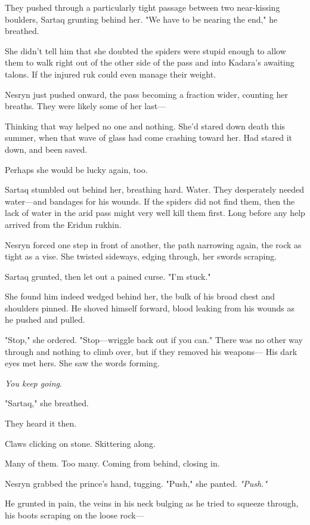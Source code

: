 They pushed through a particularly tight passage between two near-kissing boulders, Sartaq grunting behind her.
"We have to be nearing the end," he breathed.

She didn't tell him that she doubted the spiders were stupid enough to allow them to walk right out of the other side of the pass and into Kadara's awaiting talons.
If the injured ruk could even manage their weight.

Nesryn just pushed onward, the pass becoming a fraction wider, counting her breaths.
They were likely some of her last---

Thinking that way helped no one and nothing.
She'd stared down death this summer, when that wave of glass had come crashing toward her.
Had stared it down, and been saved.

Perhaps she would be lucky again, too.

Sartaq stumbled out behind her, breathing hard.
Water.
They desperately needed water---and bandages for his wounds.
If the spiders did not find them, then the lack of water in the arid pass might very well kill them first.
Long before any help arrived from the Eridun rukhin.

Nesryn forced one step in front of another, the path narrowing again, the rock as tight as a vise.
She twisted sideways, edging through, her swords scraping.

Sartaq grunted, then let out a pained curse.
"I'm stuck."

She found him indeed wedged behind her, the bulk of his broad chest and shoulders pinned.
He shoved himself forward, blood leaking from his wounds as he pushed and pulled.

"Stop," she ordered.
"Stop---wriggle back out if you can."
There was no other way through and nothing to climb over, but if they removed his weapons--- His dark eyes met hers.
She saw the words forming.

\emph{You keep going}.

"Sartaq," she breathed.

They heard it then.

Claws clicking on stone.
Skittering along.

Many of them.
Too many.
Coming from behind, closing in.

Nesryn grabbed the prince's hand, tugging.
"Push," she panted.
\emph{"Push."}

He grunted in pain, the veins in his neck bulging as he tried to squeeze through, his boots scraping on the loose rock---

